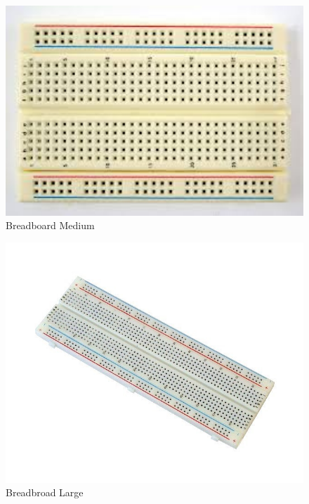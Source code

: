 \begin{enumerate}
\begin{figure}[H]
\centering
\includegraphics[width=1\textwidth]{figures/breadboard2.jpg}
\caption{Breadboard Medium}
\label{print}
\end{figure}

\begin{figure}[H]
\centering
\includegraphics[width=1\textwidth]{figures/3.jpg}
\caption{Breadbroad Large}
\label{print}
\end{figure}


\end{enumerate}

